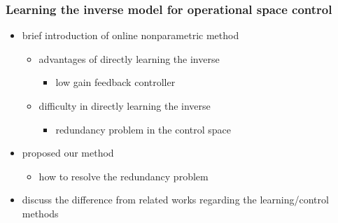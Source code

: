 \documentclass[journal,onecolumn]{IEEEtran}
\begin{document}
\subsubsection{Learning the inverse model for operational space control}
\label{sec:org7b72897}
\begin{itemize}
\item brief introduction of online nonparametric method
\begin{itemize}
\item advantages of directly learning the inverse
\begin{itemize}
\item low gain feedback controller
\end{itemize}
\item difficulty in directly learning the inverse
\begin{itemize}
\item redundancy problem in the control space
\end{itemize}
\end{itemize}
\item proposed our method
\begin{itemize}
\item how to resolve the redundancy problem
\end{itemize}
\item discuss the difference from related works regarding the learning/control methods
\end{itemize}
\end{document}

